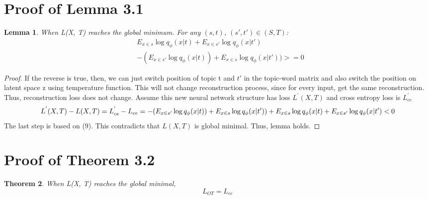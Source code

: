 \documentclass[11pt]{article}
\newtheorem{theorem}{Theorem}[section]
\newtheorem{lemma}[theorem]{Lemma}
\begin{document}
\section{Proof of Lemma 3.1}
\label{appendix:proof}
\begin{lemma} When L(X, T) reaches the global minimum. For any $(s, t)$, $(s', t') \in (S, T)$: 
\begin{equation}
\begin{aligned}
    &E_{x \in s} \log q_{\phi}(x|t) +  E_{x \in s'} \log q_{\phi}(x|t')  \\
    &- (E_{x \in s'} \log q_{\phi}(x|t)) + E_{x \in s} \log q_{\phi}(x|t')) >= 0
\end{aligned}
\label{eq21}
\end{equation}

\end{lemma}
\begin{proof}
If the reverse is true, then, we can just switch position of topic t and $t'$ in the topic-word matrix  and also switch the position on latent space z using temperature function. This will not change reconstruction process, since for every input, get the same reconstruction. Thus, reconstruction loss does not change. Assume this new neural network structure has loss $L^{'}(X, T)$ and cross entropy loss is $L^{'}_{ce}$
\begin{dmath}
L^{'}(X, T) - L(X, T)
 = L^{'}_{ce} - L_{ce} 
 = - (E_{x \in s'} \log q_{\phi}(x|t)) + E_{x \in s} \log q_{\phi}(x|t')) 
 + E_{x \in s} \log q_{\phi}(x|t) +  E_{x \in s'} \log q_{\phi}(x|t')   
 < 0  \\
\end{dmath}The last step is based on (9). This contradicts that $L(X, T)$ is global minimal.  Thus, lemma holds.
\end{proof}



\section{Proof of Theorem 3.2}
\begin{theorem}


When L(X, T) reaches the global minimal, $$L_{OT} = L_{ce}  $$
\end{theorem}
\end{document}
